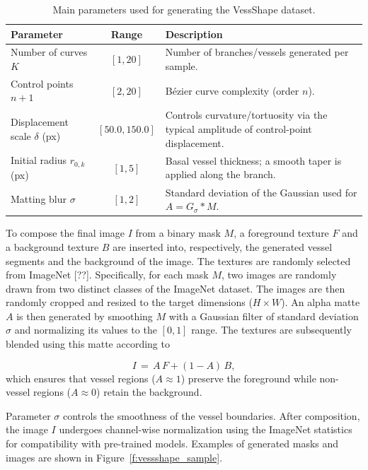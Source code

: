 \documentclass[%
reprint,
nofootinbib,
 amsmath,amssymb,
aps,
superscriptaddress,
showkeys,
longbibliography
]{revtex4-1}
\begin{document}
\begin{table}[t]
\caption{Main parameters used for generating the VessShape dataset.}
\label{tab:vessshape_params}
\centering
\begin{tabularx}{\textwidth}{l c X}
\hline
    \textbf{Parameter} & \textbf{Range} & \textbf{Description} \\
\hline
Number of curves $K$ & $[1,20]$ & Number of branches/vessels generated per sample. \\
Control points $n{+}1$ & $[2,20]$ & Bézier curve complexity (order $n$). \\
Displacement scale $\delta$ (px) & $[50.0,150.0]$ & Controls curvature/tortuosity via the typical amplitude of control-point displacement. \\
Initial radius $r_{0,k}$ (px) & $[1,5]$ & Basal vessel thickness; a smooth taper is applied along the branch. \\
Matting blur $\sigma$ & $[1,2]$ & Standard deviation of the Gaussian used for $A = G_{\sigma} * M$. \\

\hline
\end{tabularx}
\end{table}

To compose the final image $I$ from a binary mask $M$, a foreground texture $F$ and a background texture $B$ are inserted into, respectively, the generated vessel segments and the background of the image. The textures are randomly selected from ImageNet [??]. Specifically, for each mask $M$, two images are randomly drawn from two distinct classes of the ImageNet dataset. The images are then randomly cropped and resized to the target dimensions ($H \times W$). An alpha matte $A$ is then generated by smoothing $M$ with a Gaussian filter of standard deviation $\sigma$ and normalizing its values to the $[0, 1]$ range. The textures are subsequently blended using this matte according to 

\begin{equation}
I \,=\, A\,F + (1-A)\,B,
\label{eq:compose}
\end{equation}
which ensures that vessel regions ($A \approx 1$) preserve the foreground while non-vessel regions ($A \approx 0$) retain the background. 

Parameter $\sigma$ controls the smoothness of the vessel boundaries. After composition, the image $I$ undergoes channel-wise normalization using the ImageNet statistics for compatibility with pre-trained models. Examples of generated masks and images are shown in Figure~\ref{f:vessshape_sample}.
\end{document}
